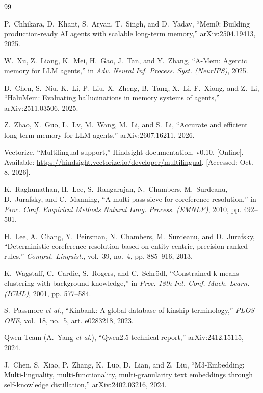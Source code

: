 \documentclass[conference]{IEEEtran}
\begin{document}
\begin{thebibliography}{99}

P.~Chhikara, D.~Khant, S.~Aryan, T.~Singh, and D.~Yadav, ``Mem0: Building
production-ready AI agents with scalable long-term memory,''
arXiv:2504.19413, 2025.

W.~Xu, Z.~Liang, K.~Mei, H.~Gao, J.~Tan, and Y.~Zhang, ``A-Mem: Agentic
memory for LLM agents,'' in \textit{Adv. Neural Inf. Process. Syst.
(NeurIPS)}, 2025.

D.~Chen, S.~Niu, K.~Li, P.~Liu, X.~Zheng, B.~Tang, X.~Li, F.~Xiong, and
Z.~Li, ``HaluMem: Evaluating hallucinations in memory systems of agents,''
arXiv:2511.03506, 2025.

Z.~Zhao, X.~Guo, L.~Lv, M.~Wang, M.~Li, and S.~Li, ``Accurate and efficient
long-term memory for LLM agents,'' arXiv:2607.16211, 2026.

Vectorize, ``Multilingual support,'' Hindsight documentation, v0.10.
[Online]. Available: \url{https://hindsight.vectorize.io/developer/multilingual}.
[Accessed: Oct. 8, 2026].

K.~Raghunathan, H.~Lee, S.~Rangarajan, N.~Chambers, M.~Surdeanu,
D.~Jurafsky, and C.~Manning, ``A multi-pass sieve for coreference
resolution,'' in \textit{Proc. Conf. Empirical Methods Natural Lang.
Process. (EMNLP)}, 2010, pp. 492--501.

H.~Lee, A.~Chang, Y.~Peirsman, N.~Chambers, M.~Surdeanu, and D.~Jurafsky,
``Deterministic coreference resolution based on entity-centric,
precision-ranked rules,'' \textit{Comput. Linguist.}, vol.~39, no.~4,
pp. 885--916, 2013.

K.~Wagstaff, C.~Cardie, S.~Rogers, and C.~Schr\"{o}dl, ``Constrained
k-means clustering with background knowledge,'' in \textit{Proc. 18th Int.
Conf. Mach. Learn. (ICML)}, 2001, pp. 577--584.

S.~Passmore \textit{et al.}, ``Kinbank: A global database of kinship
terminology,'' \textit{PLOS ONE}, vol.~18, no.~5, art. e0283218, 2023.

Qwen Team (A.~Yang \textit{et al.}), ``Qwen2.5 technical report,''
arXiv:2412.15115, 2024.

J.~Chen, S.~Xiao, P.~Zhang, K.~Luo, D.~Lian, and Z.~Liu, ``M3-Embedding:
Multi-linguality, multi-functionality, multi-granularity text embeddings
through self-knowledge distillation,'' arXiv:2402.03216, 2024.

\end{thebibliography}
\end{document}
